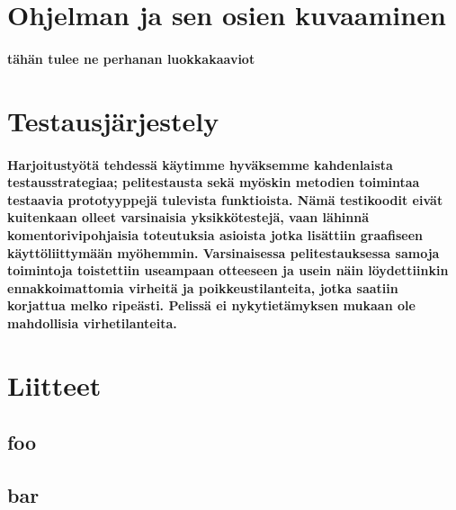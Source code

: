 \documentclass[10pt,a4paper,draft]{article}
\begin{document}
\section{Ohjelman ja sen osien kuvaaminen}
\paragraph{tähän tulee ne perhanan luokkakaaviot}

\section{Testausjärjestely}
\paragraph{Harjoitustyötä tehdessä käytimme hyväksemme kahdenlaista testausstrategiaa; pelitestausta sekä myöskin metodien toimintaa testaavia prototyyppejä tulevista funktioista. Nämä testikoodit eivät kuitenkaan olleet varsinaisia yksikkötestejä, vaan lä\-hin\-nä komentorivipohjaisia toteutuksia asioista jotka lisättiin graafiseen käyttöliittymään myöhemmin. Varsinaisessa pelitestauksessa samoja toimintoja toistettiin useampaan otteeseen ja usein näin löydettiinkin ennakkoimattomia virheitä ja poikkeustilanteita, jotka saatiin korjattua melko ripeästi. Pelissä ei nykytietämyksen mukaan ole mahdollisia virhetilanteita.}

\newpage
\section{Liitteet}
\renewcommand{\thesubsection}{\thesection.\alph{subsection}}
\subsection{foo}
\subsection{bar}
\end{document}
